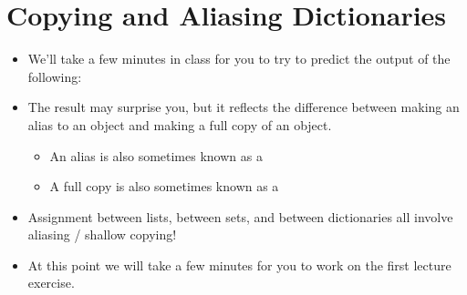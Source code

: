 \documentclass[letterpaper,10pt,english]{sphinxmanual}
\begin{document}
\section{Copying and Aliasing Dictionaries}
\label{\detokenize{lecture_notes/lec17_dictionaries2:copying-and-aliasing-dictionaries}}\begin{itemize}
\item {} 
We’ll take a few minutes in class for you to try to predict the
output of the following:

\begin{sphinxVerbatim}[commandchars=\\\{\}]
  
\PYG{p}{[}\PYG{p}{]}  
  \PYG{p}{[}\PYG{p}{]}
\PYG{p}{[}\PYG{p}{]}  
\PYG{p}{[}\PYG{p}{]}  
 \PYG{p}{[}\PYG{p}{]}
\end{sphinxVerbatim}

\item {} 
The result may surprise you, but it reflects the difference between
making an alias to an object and making a full copy of an object.
\begin{itemize}
\item {} 
An alias is also sometimes known as a 

\item {} 
A full copy is also sometimes known as a 

\end{itemize}

\item {} 
Assignment between lists, between sets, and between dictionaries all
involve aliasing / shallow copying!

\item {} 
At this point we will take a few minutes for you to work on the
first lecture exercise.

\end{itemize}
\end{document}
